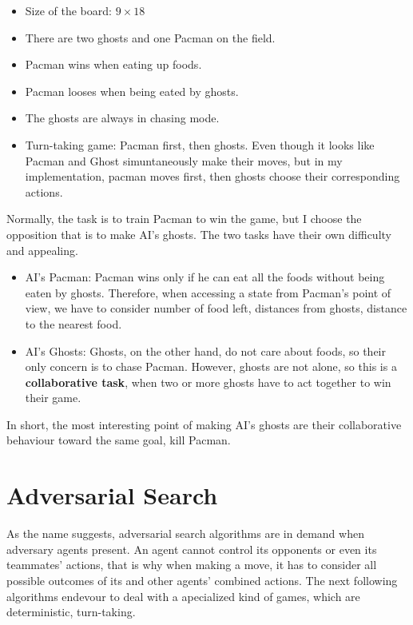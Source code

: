 \documentclass[a4paper, 11pt]{article}
\begin{document}
\begin{itemize}
\item Size of the board: $9\times 18$
\item There are two ghosts and one Pacman on the field.
\item Pacman wins when eating up foods.
\item Pacman looses when being eated by ghosts.
\item The ghosts are always in chasing mode.
\item Turn-taking game: Pacman first, then ghosts. Even though it looks like Pacman and Ghost simuntaneously make their moves, but in my implementation, pacman moves first, then ghosts choose their corresponding actions.
\end{itemize}
Normally, the task is to train Pacman to win the game, but I choose the opposition that is to make AI's ghosts. The two tasks have their own difficulty and appealing. 
\begin{itemize} 
\item AI's Pacman: Pacman wins only if he can eat all the foods without being eaten by ghosts. Therefore, when accessing a state from Pacman's point of view, we have to consider number of food left, distances from ghosts, distance to the nearest food.
\item AI's Ghosts: Ghosts, on the other hand, do not care about foods, so their only concern is to chase Pacman. However, ghosts are not alone, so this is a \textbf{collaborative task}, when two or more ghosts have to act together to win their game.
\end{itemize}
In short, the most interesting point of making AI's ghosts are their collaborative behaviour toward the same goal, kill Pacman.
\newpage
\section{Adversarial Search}
As the name suggests, adversarial search algorithms are in demand when adversary agents present. An agent cannot control its opponents or even its teammates' actions, that is why when making a move, it has to consider all possible outcomes of its and other agents' combined actions. The next following algorithms endevour to deal with a apecialized kind of games, which are deterministic, turn-taking.
\end{document}
